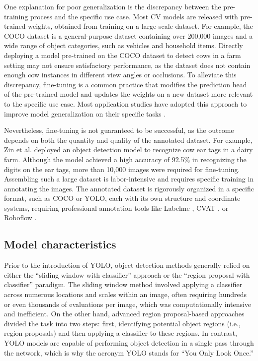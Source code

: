One explanation for poor generalization is the discrepancy between the pre-training process and the specific use case. Most CV models are released with pre-trained weights, obtained from training on a large-scale dataset. For example, the COCO dataset \cite{lin2014microsoft} is a general-purpose dataset containing over 200,000 images and a wide range of object categories, such as vehicles and household items. Directly deploying a model pre-trained on the COCO dataset to detect cows in a farm setting may not ensure satisfactory performance, as the dataset does not contain enough cow instances in different view angles or occlusions. To alleviate this discrepancy, fine-tuning is a common practice that modifies the prediction head of the pre-trained model and updates the weights on a new dataset more relevant to the specific use case. Most application studies have adopted this approach to improve model generalization on their specific tasks \cite{han2021pre,guirguis2022cfa,gupta2023novel}.

Nevertheless, fine-tuning is not guaranteed to be successful, as the outcome depends on both the quantity and quality of the annotated dataset. For example, Zin et al. \cite{zin_automatic_2020} deployed an object detection model to recognize cow ear tags in a dairy farm. Although the model achieved a high accuracy of 92.5\% in recognizing the digits on the ear tags, more than 10,000 images were required for fine-tuning. Assembling such a large dataset is labor-intensive and requires specific training in annotating the images. The annotated dataset is rigorously organized in a specific format, such as COCO or YOLO, each with its own structure and coordinate systems, requiring professional annotation tools like Labelme \cite{labelme2023}, CVAT \cite{cvat2023}, or Roboflow \cite{roboflow2023}.

\subsection*{Model characteristics}

Prior to the introduction of YOLO, object detection methods generally relied on either the “sliding window with classifier” approach or the “region proposal with classifier” paradigm. The sliding window method involved applying a classifier across numerous locations and scales within an image, often requiring hundreds or even thousands of evaluations per image, which was computationally intensive and inefficient. On the other hand, advanced region proposal-based approaches divided the task into two steps: first, identifying potential object regions (i.e., region proposals) and then applying a classifier to these regions. In contrast, YOLO models are capable of performing object detection in a single pass through the network, which is why the acronym YOLO stands for ``You Only Look Once.''

